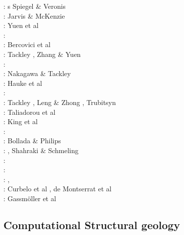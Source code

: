 \begin{scriptsize}
\nineteensixty: s Spiegel \& Veronis \cite{spve60}\\
\nineteeneighty: Jarvis \& McKenzie \cite{jamc80}\\
\nineteeneightyseven:  Yuen et al \cite{yuqh87}\\
\nineteeneightyeight: \cite{glat88}\\
\nineteenninetytwo: Bercovici et al \cite{besg92}\\
\nineteenninetysix: Tackley \cite{tack96}, Zhang \& Yuen \cite{zhyu96}\\
\nineteenninetyeight: \cite{mite98} \\
\twothousandfour: Nakagawa \& Tackley \cite{nata04}\\
\twothousandfive: Hauke et al \cite{halg05a,halg05b}\\
\twothousandseven: \cite{feku07} \\
\twothousandeight: Tackley \cite{tack08}, Leng \& Zhong \cite{lezh08}, Trubitsyn \cite{trub08}\\
\twothousandnine: Taliadorou et al \cite{tagm09} \\
\twothousandten: King et al \cite{kilv10}\\
\twothousandeleven: \cite{talz11}\\
\twothousandtwelve: Bollada \& Philips \cite{boph12}\\
\twothousandthirteen: \cite{lizh13}, Shahraki \& Schmeling \cite{shsc13}\\
\twothousandfifteen: \cite{kamo15}\\
\twothousandsixteen: \cite{ghbu16}\\
\twothousandeighteen: \cite{cogb18}, \cite{ghbu18}\\
\twothousandnineteen: Curbelo et al \cite{cuda19}, de Montserrat et al \cite{demh19}\\
\twothousandtwenty: Gassm{\"o}ller et al \cite{gadb20}
\end{scriptsize}

\subsection{Computational Structural geology}

